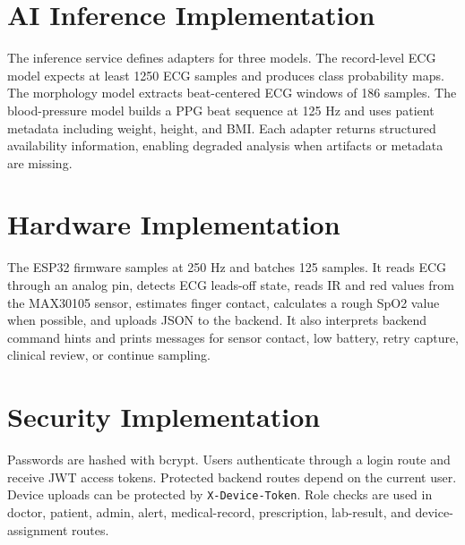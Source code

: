 \section{AI Inference Implementation}

The inference service defines adapters for three models. The record-level ECG model expects at least 1250 ECG samples and produces class probability maps. The morphology model extracts beat-centered ECG windows of 186 samples. The blood-pressure model builds a PPG beat sequence at 125 Hz and uses patient metadata including weight, height, and BMI. Each adapter returns structured availability information, enabling degraded analysis when artifacts or metadata are missing.

\section{Hardware Implementation}

The ESP32 firmware samples at 250 Hz and batches 125 samples. It reads ECG through an analog pin, detects ECG leads-off state, reads IR and red values from the MAX30105 sensor, estimates finger contact, calculates a rough SpO2 value when possible, and uploads JSON to the backend. It also interprets backend command hints and prints messages for sensor contact, low battery, retry capture, clinical review, or continue sampling.

\section{Security Implementation}

Passwords are hashed with bcrypt. Users authenticate through a login route and receive JWT access tokens. Protected backend routes depend on the current user. Device uploads can be protected by \texttt{X-Device-Token}. Role checks are used in doctor, patient, admin, alert, medical-record, prescription, lab-result, and device-assignment routes.
